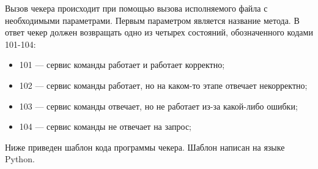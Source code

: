 Вызов чекера происходит при помощью вызова исполняемого файла с необходимыми параметрами. Первым параметром является название метода. 
В ответ чекер должен возвращать одно из четырех состояний, обозначенного кодами 101-104:
\begin{itemize}
\item 101 --- сервис команды работает и работает корректно;
\item 102 --- сервис команды работает, но на каком-то этапе отвечает некорректно;
\item 103 --- сервис команды отвечает, но не работает из-за какой-либо ошибки; 
\item 104 --- сервис команды не отвечает на запрос;
\end{itemize}



Ниже приведен шаблон кода программы чекера. Шаблон написан на языке Python.





